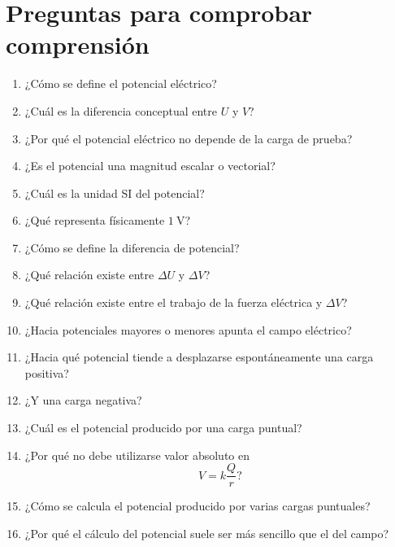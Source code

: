 \section{Preguntas para comprobar comprensión}

\begin{enumerate}
    \item ¿Cómo se define el potencial eléctrico?

    \item ¿Cuál es la diferencia conceptual entre \(U\) y \(V\)?

    \item ¿Por qué el potencial eléctrico no depende de la carga de prueba?

    \item ¿Es el potencial una magnitud escalar o vectorial?

    \item ¿Cuál es la unidad SI del potencial?

    \item ¿Qué representa físicamente \(\SI{1}{\volt}\)?

    \item ¿Cómo se define la diferencia de potencial?

    \item ¿Qué relación existe entre \(\Delta U\) y \(\Delta V\)?

    \item ¿Qué relación existe entre el trabajo de la fuerza eléctrica y
    \(\Delta V\)?

    \item ¿Hacia potenciales mayores o menores apunta el campo eléctrico?

    \item ¿Hacia qué potencial tiende a desplazarse espontáneamente una carga positiva?

    \item ¿Y una carga negativa?

    \item ¿Cuál es el potencial producido por una carga puntual?

    \item ¿Por qué no debe utilizarse valor absoluto en
    \[
    V=k\frac{Q}{r}?
    \]

    \item ¿Cómo se calcula el potencial producido por varias cargas puntuales?

    \item ¿Por qué el cálculo del potencial suele ser más sencillo que el del campo?


\end{enumerate}
